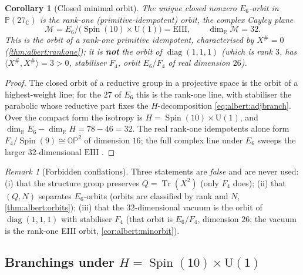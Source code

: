 \documentclass[11pt]{article}
\theoremstyle{plain}
\newtheorem{corollary}[theorem]{Corollary}
\theoremstyle{definition}
\theoremstyle{remark}
\newtheorem{remark}[theorem]{Remark}
\begin{document}
\begin{corollary}[Closed minimal orbit]\label{cor:albert:minorbit}
The unique closed nonzero $E_{6}$-orbit in $\mathbb{P}(27_{\mathbb{C}})$
is the rank-one (primitive-idempotent) orbit, the \emph{complex Cayley
plane}
\begin{equation}\label{eq:albert:EIII}
  \mathcal{M}
  = E_{6}/\bigl(\operatorname{Spin}(10)\times\mathrm{U}(1)\bigr)
  = \mathrm{EIII},
  \qquad
  \dim_{\mathbb{R}}\mathcal{M}=32 .
\end{equation}
This is the orbit of a rank-one primitive idempotent, characterised by
$X^{\#}=0$ (\autoref{thm:albert:rankone}); it is \textbf{not} the orbit
of $\operatorname{diag}(1,1,1)$ (which is rank $3$, has
$\langle X^{\#},X^{\#}\rangle=3>0$, stabiliser $F_{4}$, orbit $E_{6}/F_{4}$
of real dimension $26$).
\end{corollary}

\begin{proof}
The closed orbit of a reductive group in a projective space is the orbit
of a highest-weight line; for the $27$ of $E_{6}$ this is the rank-one
line, with stabiliser the parabolic whose reductive part fixes the
$H$-decomposition \eqref{eq:albert:adjbranch}. Over the compact form the
isotropy is $H=\operatorname{Spin}(10)\times\mathrm{U}(1)$, and
$\dim_{\mathbb{R}}E_{6}-\dim_{\mathbb{R}}H=78-46=32$. The real rank-one
idempotents alone form $F_{4}/\operatorname{Spin}(9)\cong
\mathbb{OP}^{2}$ of dimension $16$; the full complex line under $E_{6}$
sweeps the larger $32$-dimensional $\mathrm{EIII}$
\cite{Helgason:1978,Springer:2000}.
\end{proof}

\begin{remark}[Forbidden conflations]\label{rmk:albert:forbidden}
Three statements are \emph{false} and are never used:
(i) that the structure group preserves $Q=\operatorname{Tr}(X^{2})$
(only $F_{4}$ does);
(ii) that $(Q,N)$ separates $E_{6}$-orbits (orbits are classified by rank
and $N$, \autoref{thm:albert:orbits});
(iii) that the $32$-dimensional vacuum is the orbit of
$\operatorname{diag}(1,1,1)$ with stabiliser $F_{4}$ (that orbit is
$E_{6}/F_{4}$, dimension $26$; the vacuum is the rank-one EIII orbit,
\autoref{cor:albert:minorbit}).
\end{remark}

\subsection{Branchings under \texorpdfstring{$H=\operatorname{Spin}(10)\times\mathrm{U}(1)$}{H = Spin(10) x U(1)}}
\label{sec:albert:branchings}
\label{sec:potential:branchings}
\end{document}
